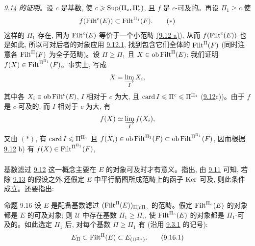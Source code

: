 \noindent \emph{\hyperref[I.prop9.14]{9.14} 的证明}。设 $c$ 是基数, 使 $c\geqslant\operatorname{Sup}(\Pi_\circ,\Pi'_\circ)$, 且 $f$ 是 $c$-可及的。再设 $\Pi_1\geq c$ 使
\begin{equation}
f(\operatorname{Filt}^c(E))\subset \operatorname{Filt}^{\Pi_1}(F){}.\tag{$\ast$}
\end{equation}
这样的 $\Pi_1$ 存在, 因为 $\operatorname{Filt}^c(E)$ 等价于一个小范畴 \hyperref[I.def9.12]{(9.12 a)}), 从而 $f(\operatorname{Filt}^c(E))$ 也是如此, 所以可对后者的对象应用 \hyperref[I.9.12.1]{9.12.1}, 找到包含它们全体的 $\operatorname{Filt}^{\Pi}(F)$ (同时注意各 $\operatorname{Filt}^{\Pi}(F)$ 为全子范畴)。设 $\Pi\geq\Pi_1$ 且 $X\in\operatorname{ob}\operatorname{Filt}^{\Pi}(E)$; 我们证明 $f(X)\in\operatorname{Filt}^{\Pi^{\Pi_1}}(F)$。事实上, 写成
$$
X=\varinjlim_I X_i{},
$$
其中各 $X_i\in\operatorname{ob}\operatorname{Filt}^c(E)$, $I$ 相对于 $c$ 为大, 且
$\operatorname{card} I\leqslant\Pi^c\leqslant\Pi^{\Pi_1}$
(\hyperref[I.def9.12]{9.12}c))。由于 $f$ 是 $c$-可及的, 而 $I$ 相对于 $c$ 为大, 有
$$
f(X)\simeq \varinjlim_I f(X_i){},
$$
又由 $(\ast)$, 有 $\operatorname{card} I\leqslant\Pi^{\Pi_1}$ 且 $f(X_i)\in\operatorname{ob}\operatorname{Filt}^{\Pi_1}(F)\subset
\operatorname{ob}\operatorname{Filt}^{\Pi^{\Pi_1}}(F)$, 因而根据 \hyperref[I.def9.12]{9.12} b) 有 $f(X)\in\operatorname{Filt}^{\Pi^{\Pi_1}}(F)$, \cqfd

\setcounter{subsection}{15} \setcounter{subsubsection}{0}
\subsubsection{}
基数滤过 \hyperref[I.def9.12]{9.12} 这一概念主要在 $E$ 的对象可及时才有意义。指出, 由 \hyperref[I.prop9.11]{9.11} 可知, 若除 \hyperref[I.prop9.13]{9.13} 的假设之外,\pageoriginale 还假定 $E$ 中平行箭图所成范畴上的函子 $\operatorname{Ker}$ 可及, 则此条件成立。还要指出:


\begin{enonce*}{命题 9.16}
设 $E$ 是配备基数滤过 $(\operatorname{Filt}^{\Pi}(E))_{\Pi\geqslant\Pi_\circ}$ 的范畴。假定 $\operatorname{Filt}^{\Pi_\circ}(E)$ 的对象都是 $E$ 的可及对象; 则 $𝒰$ 中存在基数 $\Pi_1\geq\Pi_\circ$, 使 $\operatorname{Filt}^{\Pi_\circ}(E)$ 的对象都是 $\Pi_1$-可及的。如此选定 $\Pi_1$ 后, 对每个基数 $\Pi\geq \Pi_1$ 有 (沿用 \hyperref[I.sec9.3.1]{9.3.1} 的记号):
\hypertarget{sga4.exp.I.equation.9.16.1}{}\begin{equation}
E_{\Pi}\subset \operatorname{Filt}^{\Pi}(E)\subset
E_{(\Pi^{\Pi_\circ})}{}.\tag{9.16.1}
\end{equation}
\end{enonce*}


